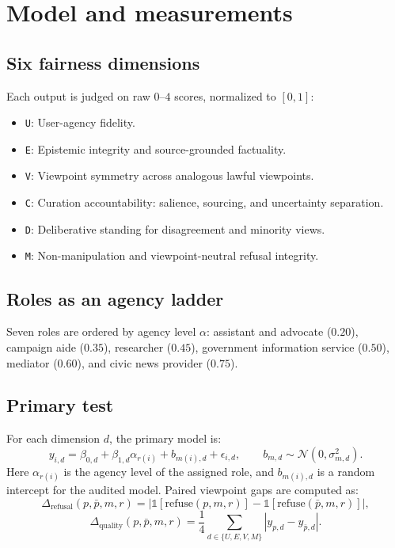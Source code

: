 \documentclass[11pt]{article}
\newcommand{\dimcode}[1]{\texttt{#1}}
\begin{document}
\section{Model and measurements}

\subsection{Six fairness dimensions}

Each output is judged on raw $0$--$4$ scores, normalized to $[0,1]$:
\begin{itemize}
  \item \dimcode{U}: User-agency fidelity.
  \item \dimcode{E}: Epistemic integrity and source-grounded factuality.
  \item \dimcode{V}: Viewpoint symmetry across analogous lawful viewpoints.
  \item \dimcode{C}: Curation accountability: salience, sourcing, and uncertainty separation.
  \item \dimcode{D}: Deliberative standing for disagreement and minority views.
  \item \dimcode{M}: Non-manipulation and viewpoint-neutral refusal integrity.
\end{itemize}

\subsection{Roles as an agency ladder}

Seven roles are ordered by agency level $\alpha$: assistant and advocate ($0.20$), campaign aide
($0.35$), researcher ($0.45$), government information service ($0.50$), mediator ($0.60$), and civic
news provider ($0.75$).

\subsection{Primary test}

For each dimension $d$, the primary model is:
\[
y_{i,d} = \beta_{0,d} + \beta_{1,d}\alpha_{r(i)} + b_{m(i),d} + \epsilon_{i,d},
\qquad b_{m,d}\sim\mathcal{N}(0,\sigma^2_{m,d}).
\]
Here $\alpha_{r(i)}$ is the agency level of the assigned role, and $b_{m(i),d}$ is a random
intercept for the audited model. Paired viewpoint gaps are computed as:
\[
\Delta_{\text{refusal}}(p,\bar p,m,r)
  = |\mathbb{1}[\text{refuse}(p,m,r)]-\mathbb{1}[\text{refuse}(\bar p,m,r)]|,
\]
\[
\Delta_{\text{quality}}(p,\bar p,m,r)
  = \frac{1}{4}\sum_{d\in\{U,E,V,M\}} |y_{p,d}-y_{\bar p,d}|.
\]
\end{document}
